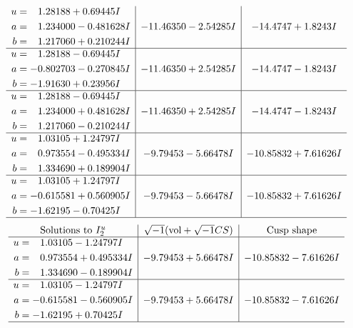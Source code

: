 \documentclass[1p]{elsarticle_modified}
\theoremstyle{definition}
\newcommand{\I}{\sqrt{-1}}
\begin{document}
$$\begin{array}{c|c|c}
\begin{aligned}
u &= \phantom{-}1.28188 + 0.69445 I \\
a &= \phantom{-}1.234000 - 0.481628 I \\
b &= \phantom{-}1.217060 + 0.210244 I\end{aligned}
 & -11.46350 - 2.54285 I & -14.4747 + 1.8243 I \\ \hline\begin{aligned}
u &= \phantom{-}1.28188 - 0.69445 I \\
a &= -0.802703 - 0.270845 I \\
b &= -1.91630 + 0.23956 I\end{aligned}
 & -11.46350 + 2.54285 I & -14.4747 - 1.8243 I \\ \hline\begin{aligned}
u &= \phantom{-}1.28188 - 0.69445 I \\
a &= \phantom{-}1.234000 + 0.481628 I \\
b &= \phantom{-}1.217060 - 0.210244 I\end{aligned}
 & -11.46350 + 2.54285 I & -14.4747 - 1.8243 I \\ \hline\begin{aligned}
u &= \phantom{-}1.03105 + 1.24797 I \\
a &= \phantom{-}0.973554 - 0.495334 I \\
b &= \phantom{-}1.334690 + 0.189904 I\end{aligned}
 & -9.79453 - 5.66478 I & -10.85832 + 7.61626 I \\ \hline\begin{aligned}
u &= \phantom{-}1.03105 + 1.24797 I \\
a &= -0.615581 + 0.560905 I \\
b &= -1.62195 - 0.70425 I\end{aligned}
 & -9.79453 - 5.66478 I & -10.85832 + 7.61626 I\\
 \hline 
 \end{array}$$\newpage$$\begin{array}{c|c|c}  
\text{Solutions to }I^u_{2}& \I (\text{vol} + \sqrt{-1}CS) & \text{Cusp shape}\\
 \hline 
\begin{aligned}
u &= \phantom{-}1.03105 - 1.24797 I \\
a &= \phantom{-}0.973554 + 0.495334 I \\
b &= \phantom{-}1.334690 - 0.189904 I\end{aligned}
 & -9.79453 + 5.66478 I & -10.85832 - 7.61626 I \\ \hline\begin{aligned}
u &= \phantom{-}1.03105 - 1.24797 I \\
a &= -0.615581 - 0.560905 I \\
b &= -1.62195 + 0.70425 I\end{aligned}
 & -9.79453 + 5.66478 I & -10.85832 - 7.61626 I\\
 \hline 
 \end{array}$$\newpage\newpage\renewcommand{\arraystretch}{1}
\end{document}
